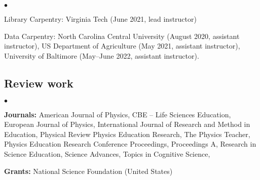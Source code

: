 \documentclass[a4paper,10pt]{article}
\newcommand{\squishlist}{
	\begin{list}{$\bullet$}
		{ \setlength{\itemsep}{0pt}
			\setlength{\parsep}{3pt}
			\setlength{\topsep}{3pt}
			\setlength{\partopsep}{0pt}
			\setlength{\labelwidth}{1em}
			\setlength{\labelsep}{0.5em} } }
\newcommand{\squishend}{
\end{list}  }
\begin{document}
\squishlist
\item Library Carpentry: Virginia Tech (June 2021, lead instructor)
\item Data Carpentry: North Carolina Central University (August 2020, assistant instructor),  US Department of Agriculture (May 2021, assistant instructor), University of Baltimore (May--June 2022, assistant instructor).
\squishend


\subsection*{Review work}

\squishlist
\item \textbf{Journals:} American Journal of Physics, CBE – Life Sciences Education, European Journal of Physics, International Journal of Research and Method in Education, Physical Review Physics Education Research, The Physics Teacher, Physics Education Research Conference Proceedings, Proceedings A, Research in Science Education, Science Advances, Topics in Cognitive Science, 
\item \textbf{Grants:} National Science Foundation (United States)
\squishend

 
\end{document}
